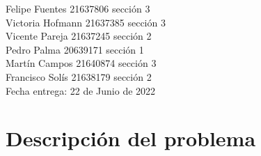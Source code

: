 \documentclass[letterpaper]{article}
\begin{document}
\vspace*{30mm}
\flushright 
	
Felipe Fuentes 	21637806  sección 3 \\
Victoria Hofmann 	21637385  sección 3\\
Vicente Pareja 	21637245 sección 2\\
Pedro Palma 	20639171  sección 1\\
Martín Campos 	21640874  sección 3\\
Francisco Solís  21638179  sección 2\\

 
\vspace*{5mm}
{\large Fecha entrega: 22 de Junio de 2022\\}
\flushleft
\newpage

\tableofcontents

\newpage

\section{Descripción del problema}
\end{document}
